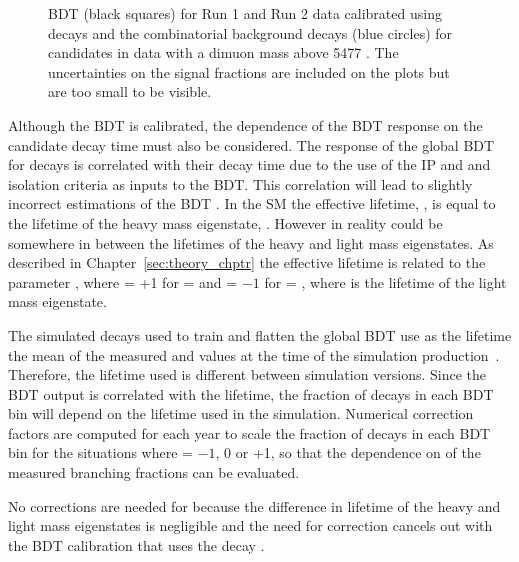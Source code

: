 \begin{figure}[tbp]
\begin{subfigure}[b]{0.48\textwidth}
   \end{subfigure}
    \caption{\bmumu BDT \pdfs (black squares) for Run 1 and Run 2 data calibrated using \bdkpi decays and the combinatorial background decays (blue circles) for \bmumu candidates in data with a dimuon mass above 5477 \mevcc. The uncertainties on the signal fractions are included on the plots but are too small to be visible. }
    \label{fig:BDTpdfs}
\end{figure}


Although the BDT is calibrated, the dependence of the BDT response on the \bsd candidate decay time must also be considered. 
The response of the global BDT for \bmumu decays is correlated with their decay time due to the use of the \bs IP and \chiIP and isolation criteria as inputs to the BDT. This correlation will lead to slightly incorrect estimations of the \bsmumu BDT \pdf. In the SM the \bsmumu effective lifetime, \tmumu, is equal to the lifetime of the heavy \bs mass eigenstate, \tH. However in reality \tmumu could be somewhere in between the lifetimes of the heavy and light mass eigenstates. As described in Chapter~\ref{sec:theory_chptr} the \bsmumu effective lifetime is related to the parameter \ADG, where \ADG = +1 for \tmumu = \tH and \ADG = $-1$ for \tmumu = \tL, where \tL is the lifetime of the light \bsmumu mass eigenstate.

The simulated decays used to train and flatten the global BDT use as the \bsmumu lifetime the mean of the measured \tH and \tL values at the time of the simulation production~\cite{Olive:2016xmw}. Therefore, the lifetime used is different between simulation versions. Since the BDT output is correlated with the lifetime, the fraction of \bsmumu decays in each BDT bin will depend on the lifetime used in the simulation. Numerical correction factors are computed for each year to scale the fraction of \bsmumu decays in each BDT bin for the situations where \ADG = $-1$, 0 or +1, so that the dependence on \ADG of the measured branching fractions can be evaluated.

No corrections are needed for \bdmumu because the difference in lifetime of the heavy and light \bd mass eigenstates is negligible and the need for correction cancels out with the BDT calibration that uses the \bd decay \bdkpi. 

